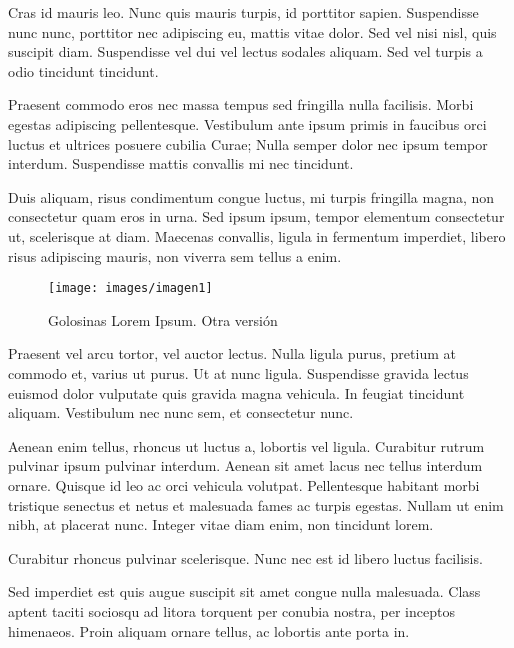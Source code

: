 \documentclass[12pt,a4paper]{report}
\begin{document}
Cras id mauris leo. Nunc quis mauris turpis, id porttitor sapien. Suspendisse nunc nunc, porttitor nec adipiscing eu, mattis vitae dolor. Sed vel nisi nisl, quis suscipit diam. Suspendisse vel dui vel lectus sodales aliquam. Sed vel turpis a odio tincidunt tincidunt.

Praesent commodo eros nec massa tempus sed fringilla nulla facilisis. Morbi egestas adipiscing pellentesque. Vestibulum ante ipsum primis in faucibus orci luctus et ultrices posuere cubilia Curae; Nulla semper dolor nec ipsum tempor interdum. Suspendisse mattis convallis mi nec tincidunt. 

Duis aliquam, risus condimentum congue luctus, mi turpis fringilla magna, non consectetur quam eros in urna. Sed ipsum ipsum, tempor elementum consectetur ut, scelerisque at diam. Maecenas convallis, ligula in fermentum imperdiet, libero risus adipiscing mauris, non viverra sem tellus a enim.



\begin{figure}[h]
\centering
\texttt{[image: images/imagen1]}
\caption{Golosinas Lorem Ipsum. Otra versión}
\label{figure.golosinasotra}
\end{figure}




Praesent vel arcu tortor, vel auctor lectus. Nulla ligula purus, pretium at commodo et, varius ut purus. Ut at nunc ligula. Suspendisse gravida lectus euismod dolor vulputate quis gravida magna vehicula. In feugiat tincidunt aliquam. Vestibulum nec nunc sem, et consectetur nunc. 

Aenean enim tellus, rhoncus ut luctus a, lobortis vel ligula. Curabitur rutrum pulvinar ipsum pulvinar interdum. Aenean sit amet lacus nec tellus interdum ornare. Quisque id leo ac orci vehicula volutpat. Pellentesque habitant morbi tristique senectus et netus et malesuada fames ac turpis egestas. Nullam ut enim nibh, at placerat nunc. Integer vitae diam enim, non tincidunt lorem. 

Curabitur rhoncus pulvinar scelerisque. Nunc nec est id libero luctus facilisis.

Sed imperdiet est quis augue suscipit sit amet congue nulla malesuada. Class aptent taciti sociosqu ad litora torquent per conubia nostra, per inceptos himenaeos. Proin aliquam ornare tellus, ac lobortis ante porta in. 
\end{document}
